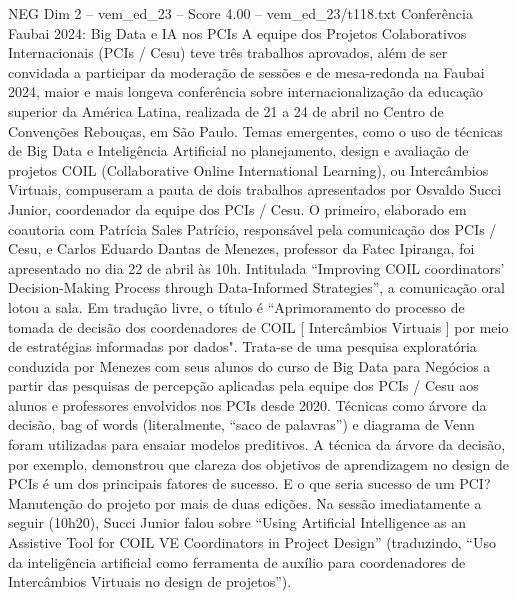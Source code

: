 \begin{textsample}{NEG Dim 2 – vem\_ed\_23 – Score 4.00 – vem\_ed\_23/t118.txt}  \label{ex:f2_neg_083}
Conferência Faubai 2024: Big Data e IA nos PCIs A equipe dos Projetos Colaborativos Internacionais (PCIs / Cesu) teve três trabalhos aprovados, além de ser convidada a participar da moderação de sessões e de mesa-redonda na Faubai 2024, maior e mais longeva conferência sobre internacionalização da educação superior da América Latina, realizada de 21 a 24 de abril no Centro de Convenções Rebouças, em São Paulo.
Temas emergentes, como o uso de técnicas de Big Data e Inteligência Artificial no planejamento, design e avaliação de projetos COIL (Collaborative Online International Learning), ou Intercâmbios Virtuais, compuseram a pauta de dois trabalhos apresentados por Osvaldo Succi Junior, coordenador da equipe dos PCIs / Cesu.
O primeiro, elaborado em coautoria com Patrícia Sales Patrício, responsável pela comunicação dos PCIs / Cesu, e Carlos Eduardo Dantas de Menezes, professor da Fatec Ipiranga, foi apresentado no dia 22 de abril às 10h.
Intitulada “Improving COIL coordinators’ Decision-Making Process through Data-Informed Strategies”, a comunicação oral lotou a sala.
Em tradução livre, o título é “Aprimoramento do processo de tomada de decisão dos coordenadores de COIL [ Intercâmbios Virtuais ] por meio de estratégias informadas por dados".
Trata-se de uma pesquisa exploratória conduzida por Menezes com seus alunos do curso de Big Data para Negócios a partir das pesquisas de percepção aplicadas pela equipe dos PCIs / Cesu aos alunos e professores envolvidos nos PCIs desde 2020.
Técnicas como árvore da decisão, bag of words (literalmente, “saco de palavras”) e diagrama de Venn foram utilizadas para ensaiar modelos preditivos.
A técnica da árvore da decisão, por exemplo, demonstrou que clareza dos objetivos de aprendizagem no design de PCIs é um dos principais fatores de sucesso.
E o que seria sucesso de um PCI?
Manutenção do projeto por mais de duas edições.
Na sessão imediatamente a seguir (10h20), Succi Junior falou sobre “Using Artificial Intelligence as an Assistive Tool for COIL VE Coordinators in Project Design” (traduzindo, “Uso da inteligência artificial como ferramenta de auxílio para coordenadores de Intercâmbios Virtuais no design de projetos”).

\end{textsample}
